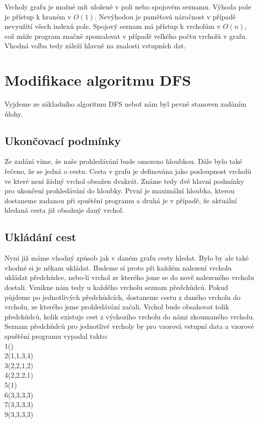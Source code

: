Vrcholy grafu je možné mít uložené v poli nebo spojovém seznamu. Výhoda pole je přístup k hraném v $O(1)$. Nevýhodou je paměťová náročnost v případě nevyužití všech indexů pole. Spojový seznam má přístup k vrcholům v $O(n)$, což může program značně zpomalovat v případě velkého počtu vrcholů v grafu. Vhodná volba tedy záleží hlavně na znalosti vstupních dat.

\section{Modifikace algoritmu DFS}
Vyjdeme ze základního algoritmu DFS neboť nám byl pevně stanoven zadáním úlohy.

\subsection{Ukončovací podmínky}
 Ze zadání víme, že naše prohledávání bude omezeno hloubkou. Dále bylo také řečeno, že se jedná o cestu. Cesta v grafu je definována jako posloupnost vrcholů ve které není žádný vrchol obsažen dvakrát. Známe tedy dvě hlavní podmínky pro ukončení prohledávání do hloubky. První je maximální hloubka, kterou dostaneme zadanou při spuštění programu a druhá je v případě, že aktuální hledaná cesta již obsahuje daný vrchol.
 
 \subsection{Ukládání cest}
  Nyní již máme vhodný způsob jak v daném grafu cesty hledat. Bylo by ale také vhodné si je někam ukládat. Budeme si proto při každém nalezení vrcholu ukládat předchůdce, nebo-li vrchol ze kterého jsme se do nově nalezeného vrcholu dostali. Vznikne nám tedy u každého vrcholu seznam předchůdců. Pokud půjdeme po jednotlivých předchůdcích, dostaneme cestu z daného vrcholu do vrcholu, ze kterého jsme prohledávání začali. Vrchol bude obsahovat tolik předchůdců, kolik existuje cest z výchozího vrcholu do námi zkoumaného vrcholu.\\
  
  Seznam předchůdců pro jednotlivé vrcholy by pro vzorová vstupní data a vzorové spuštění programu vypadal takto:\\
  
  1()\\
  2(1,1,3,4)\\
  3(2,2,1,2)\\
  4(2,2,2,1)\\
  5(1)\\
  6(3,3,3,3)\\
  7(3,3,3,3)\\
  9(3,3,3,3)\\
  
